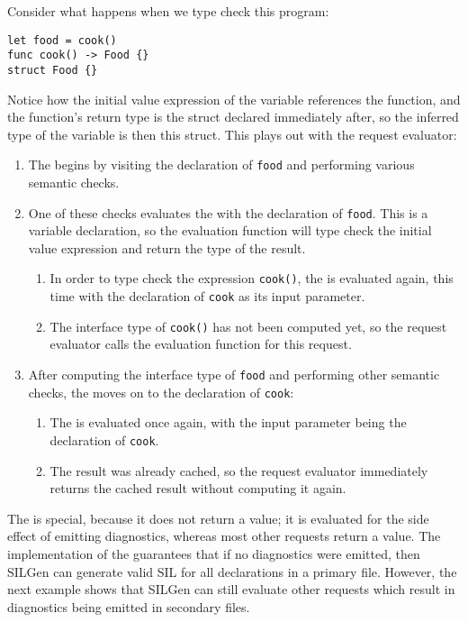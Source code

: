 \documentclass[../generics]{subfiles}
\begin{document}
\begin{example}
Consider what happens when we type check this program:
\begin{Verbatim}
let food = cook()
func cook() -> Food {}
struct Food {}
\end{Verbatim}
Notice how the initial value expression of the variable references the function, and the function's return type is the struct declared immediately after, so the inferred type of the variable is then this struct. This plays out with the request evaluator:
\begin{enumerate}
\item The  begins by visiting the declaration of \texttt{food} and performing various semantic checks.
\item One of these checks evaluates the  with the declaration of \texttt{food}. This is a variable declaration, so the evaluation function will type check the initial value expression and return the type of the result.
\begin{enumerate}
\item In order to type check the expression \texttt{cook()}, the  is evaluated again, this time with the declaration of \texttt{cook} as its input parameter.
\item The interface type of \texttt{cook()} has not been computed yet, so the request evaluator calls the evaluation function for this request.
\end{enumerate}
\item After computing the interface type of \texttt{food} and performing other semantic checks, the  moves on to the declaration of \texttt{cook}:
\begin{enumerate}
\item The  is evaluated once again, with the input parameter being the declaration of \texttt{cook}.
\item The result was already cached, so the request evaluator immediately returns the cached result without computing it again.
\end{enumerate}
\end{enumerate}
\end{example}

The  is special, because it does not return a value; it is evaluated for the side effect of emitting diagnostics, whereas most other requests return a value. The implementation of the  guarantees that if no diagnostics were emitted, then SILGen can generate valid SIL for all declarations in a primary file. However, the next example shows that SILGen can still evaluate other requests which result in diagnostics being emitted in secondary files.
\end{document}

